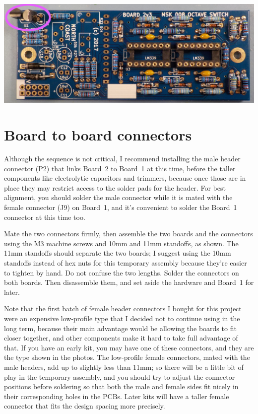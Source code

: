 \noindent\includegraphics[width=\linewidth]{vreg.jpg}

\section{Board to board connectors}

Although the sequence is not critical, I recommend installing the male
header connector (P2) that links Board~2 to Board~1 at this time, before the
taller components like electrolytic capacitors and trimmers, because once
those are in place they may restrict access to the solder pads for the
header.  For best alignment, you should solder the male connector while it
is mated with the female connector (J9) on Board~1, and it's convenient to
solder the Board~1 connector at this time too.

Mate the two connectors firmly, then assemble the two boards and the
connectors using the M3 machine screws and 10mm and 11mm standoffs, as
shown.  The 11mm standoffs should separate the two boards; I suggest using
the 10mm standoffs instead of hex nuts for this temporary assembly because
they're easier to tighten by hand.  Do not confuse the two lengths.  Solder
the connectors on both boards.  Then disassemble them, and set aside the
hardware and Board~1 for later.

Note that the first batch of female header connectors I bought for this
project were an expensive low-profile type that I decided not to continue
using in the long term, because their main advantage would be allowing the
boards to fit closer together, and other components make it hard to take full
advantage of that.  If you have an early kit, you may have one of these
connectors, and they are the type shown in the photos.  The low-profile
female connectors, mated with the male headers, add up to slightly less than
11mm; so there will be a little bit of play in the temporary assembly, and
you should try to adjust the connector positions before soldering so that
both the male and female sides fit nicely in their corresponding holes in
the PCBs.  Later kits will have a taller female connector that fits the
design spacing more precisely.


